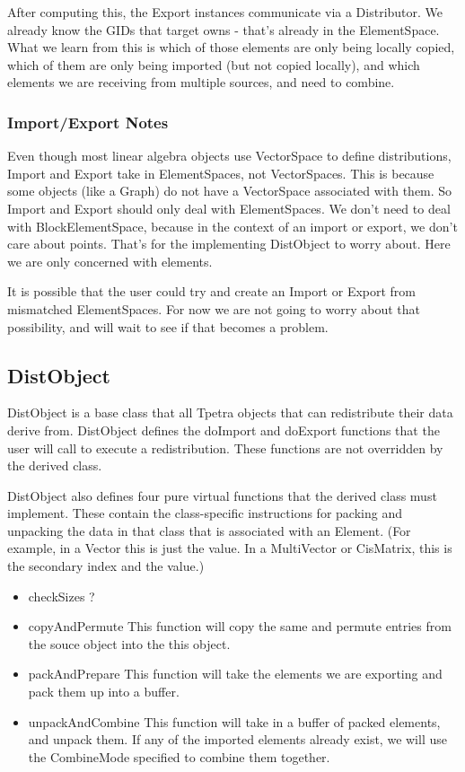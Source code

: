 \documentclass[10pt,relax]{TpetraDesign}
\begin{document}
After computing this, the Export instances communicate via a Distributor. We already know the GIDs that target owns - that's already in the ElementSpace. What we learn from this is which of those elements are only being locally copied, which of them are only being imported (but not copied locally), and which elements we are receiving from multiple sources, and need to combine.


\subsubsection*{Import/Export Notes}
Even though most linear algebra objects use VectorSpace to define distributions, Import and Export take in ElementSpaces, not VectorSpaces. This is because some objects (like a Graph) do not have a VectorSpace associated with them. So Import and Export should only deal with ElementSpaces. We don't need to deal with BlockElementSpace, because in the context of an import or export, we don't care about points. That's for the implementing DistObject to worry about. Here we are only concerned with elements.

It is possible that the user could try and create an Import or Export from mismatched ElementSpaces. For now we are not going to worry about that possibility, and will wait to see if that becomes a problem.

\subsection{DistObject}

DistObject is a base class that all Tpetra objects that can redistribute their data derive from. DistObject defines the doImport and doExport functions that the user will call to execute a redistribution. These functions are not overridden by the derived class. 

DistObject also defines four pure virtual functions that the derived class must implement. These contain the class-specific instructions for packing and unpacking the data in that class that is associated with an Element. (For example, in a Vector this is just the value. In a MultiVector or CisMatrix, this is the secondary index and the value.)
\begin{itemize}
\item checkSizes ?
\item copyAndPermute This function will copy the same and permute entries from the souce object into the this object.
\item packAndPrepare This function will take the elements we are exporting and pack them up into a buffer.
\item unpackAndCombine This function will take in a buffer of packed elements, and unpack them. If any of the imported elements already exist, we will use the CombineMode specified to combine them together.
\end{itemize}
\end{document}
